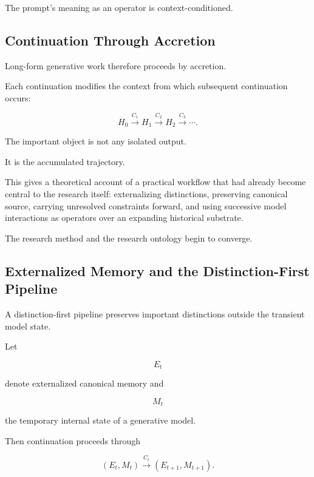 \documentclass[11pt]{article}
\theoremstyle{remark}
\begin{document}
The prompt's meaning as an operator is context-conditioned.

\subsection{Continuation Through Accretion}

Long-form generative work therefore proceeds by accretion.

Each continuation modifies the context from which subsequent continuation occurs:

\begin{equation}
H_0
\xrightarrow{C_1}
H_1
\xrightarrow{C_2}
H_2
\xrightarrow{C_3}
\cdots.
\end{equation}

The important object is not any isolated output.

It is the accumulated trajectory.

This gives a theoretical account of a practical workflow that had already become central to the research itself: externalizing distinctions, preserving canonical source, carrying unresolved constraints forward, and using successive model interactions as operators over an expanding historical substrate.

The research method and the research ontology begin to converge.

\subsection{Externalized Memory and the Distinction-First Pipeline}

A distinction-first pipeline preserves important distinctions outside the transient model state.

Let

\begin{equation}
E_t
\end{equation}

denote externalized canonical memory and

\begin{equation}
M_t
\end{equation}

the temporary internal state of a generative model.

Then continuation proceeds through

\begin{equation}
(E_t,M_t)
\xrightarrow{C_t}
(E_{t+1},M_{t+1}).
\end{equation}
\end{document}
